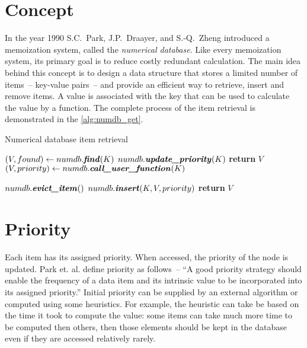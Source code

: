 

\section{Concept}
In the year 1990 S.C.~Park, J.P.~Draayer, and S.-Q.~Zheng introduced a memoization system, called the \emph{numerical database}\cite{park90}. Like every memoization system, its primary goal is to reduce costly redundant calculation. The main idea behind this concept is to design a data structure that stores a limited number of items~-- key-value pairs~-- and provide an efficient way to retrieve, insert and remove items. A value is associated with the key that can be used to calculate the value by a function. The complete process of the item retrieval is demonstrated in the \cref{alg:numdb_get}.

\begin{algorithm}
\caption{Numerical database item retrieval}\label{alg:numdb_get}
\begin{algorithmic}[1]
    \State $(V, found) \gets numdb.\textbf{\textit{find}}(K) $
      \State $numdb.\textbf{\textit{update\_priority}}(K) $ 
      \State \textbf{return} $V$
    \EndIf
    \State {}
    \State $(V, priority) \gets numdb.\textbf{\textit{call\_user\_function}}(K)$

      \State $numdb.\textbf{\textit{evict\_item}}()$ 
    \EndIf
    \State $numdb.\textbf{\textit{insert}}(K, V, priority)$
    \State \textbf{return} $V$
  \EndProcedure
\end{algorithmic}
\end{algorithm}

\section{Priority}
\label{sec:wst_priority}

Each item has its assigned priority. When accessed, the priority of the node is updated. Park et. al. define priority as follows~-- ``A good priority strategy should enable the frequency of a data item and its intrinsic value to be incorporated into its assigned priority.'' Initial priority can be supplied by an external algorithm or computed using some heuristics. For example, the heuristic can take be based on the time it took to compute the value: some items can take much more time to be computed then others, then those elements should be kept in the database even if they are accessed relatively rarely.


